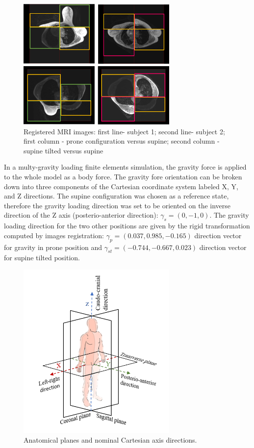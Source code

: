 \begin{figure}[!h]
\centering
\includegraphics[width=0.7\textwidth,keepaspectratio]{figures/patientDataRegistered.png} 
\caption{Registered MRI images: first line- subject 1; second line- subject 2; first column - prone configuration versus supine; second column - supine tilted versus supine }\label{fig:patientdataregistered}
\end{figure}

In a  multy-gravity loading finite elements simulation, the gravity force is applied to the whole model as a body force. The gravity fore orientation can be broken down into three components of the Cartesian coordinate system labeled X, Y, and Z directions. The supine configuration was chosen as a reference state, therefore the gravity loading direction was set to be oriented on the inverse direction  of the Z axis (posterio-anterior direction): $\gamma_s = (0,-1,0)$.   The gravity loading direction for the two other positions are given by the rigid transformation computed by images registration: $\gamma_p = (0.037, 0.985, -0.165)$ direction vector for gravity in prone position and $\gamma_{st} = (-0.744 , -0.667, 0.023)$ direction vector for supine tilted position.

\begin{figure}[!ht]
\centering
\includegraphics[width=0.7\textwidth,keepaspectratio]{figures/xyz_axis_directions.png} 
\caption{Anatomical planes and nominal Cartesian axis directions.}\label{fig:xyz_axis_directions}
\end{figure}

